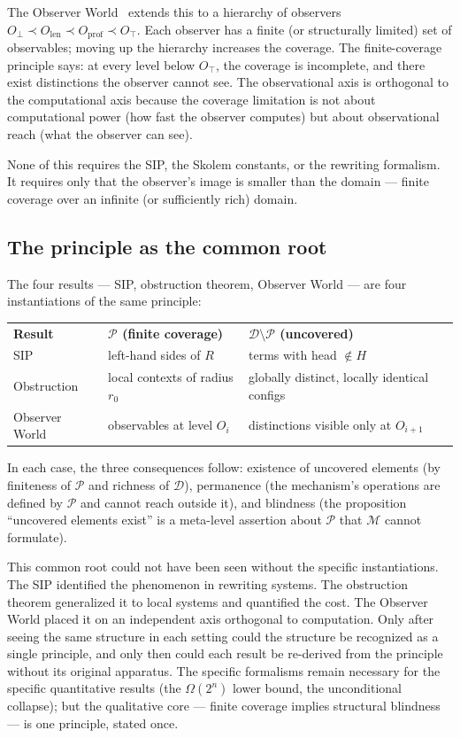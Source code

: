 \documentclass[11pt]{article}
\begin{document}
The Observer World~\cite{buono2026observer} extends this to a hierarchy
of observers $O_\bot \prec O_{\mathrm{len}} \prec O_{\mathrm{prof}}
\prec O_\top$. Each observer has a finite (or structurally limited) set
of observables; moving up the hierarchy increases the coverage. The
finite-coverage principle says: at every level below $O_\top$, the
coverage is incomplete, and there exist distinctions the observer cannot
see. The observational axis is orthogonal to the computational axis
because the coverage limitation is not about computational power (how
fast the observer computes) but about observational reach (what the
observer can see).

None of this requires the SIP, the Skolem constants, or the rewriting
formalism. It requires only that the observer's image is smaller than
the domain --- finite coverage over an infinite (or sufficiently rich)
domain.

\subsection{The principle as the common root}

The four results --- SIP, obstruction theorem, Observer
World --- are four instantiations of the same principle:

\medskip
\begin{center}
\begin{tabular}{lll}
\textbf{Result} & \textbf{$\mathcal{P}$ (finite coverage)}
  & \textbf{$\mathcal{D} \setminus \mathcal{P}$ (uncovered)} \\[4pt]
SIP & left-hand sides of $R$ & terms with head $\notin H$ \\[2pt]
Obstruction & local contexts of radius $r_0$
  & globally distinct, locally identical configs \\[2pt]
Observer World & observables at level $O_i$
  & distinctions visible only at $O_{i+1}$
\end{tabular}
\end{center}

\medskip
In each case, the three consequences follow: existence of uncovered
elements (by finiteness of $\mathcal{P}$ and richness of $\mathcal{D}$),
permanence (the mechanism's operations are defined by $\mathcal{P}$ and
cannot reach outside it), and blindness (the proposition ``uncovered
elements exist'' is a meta-level assertion about $\mathcal{P}$ that
$\mathcal{M}$ cannot formulate).

This common root could not have been seen without the specific
instantiations. The SIP identified the phenomenon in rewriting systems.
The obstruction theorem generalized it to local systems and quantified
the cost. The Observer World placed it on an independent axis orthogonal
to computation. Only after seeing the same structure in each setting
could the structure be recognized as a single principle, and only then
could each result be re-derived from the principle without its original
apparatus. The specific formalisms remain necessary for the specific
quantitative results (the $\Omega(2^n)$ lower bound, the unconditional
collapse); but the qualitative core --- finite coverage implies
structural blindness --- is one principle, stated once.
\end{document}
